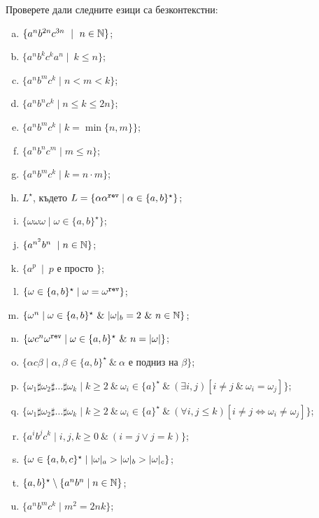 \begin{extra}
\begin{problem}
  Проверете дали следните езици са безконтекстни:
  \begin{enumerate}[a)]
  \item
    $\{a^nb^{2n}c^{3n}\ \mid\ n\in\Nat\}$;
  \item
    $\{a^nb^kc^ka^n\mid\ k \leq n\}$;
  \item
    $\{a^nb^mc^k\mid n < m < k\}$;
  \item
    $\{a^nb^nc^k\mid n \leq k \leq 2n\}$;
  \item
    $\{a^nb^mc^k\mid k = \min\{n,m\}\}$;
  \item
    $\{a^nb^nc^m\mid m \leq n\}$;
  \item
    $\{a^nb^mc^k\mid k = n\cdot m\}$;
  \item
    $L^\star$, където
    $L = \{\alpha\alpha^{\texttt{rev}} \mid \alpha \in \{a,b\}^\star\}$;
  \item
    $\{\omega\omega\omega\mid \omega\in \{a,b\}^\star\}$;
  \item
    $\{a^{n^2}b^n\ \mid n \in \mathbb{N}\}$;
  \item
    $\{a^p\ \mid\ p\mbox{ е просто }\}$;
  \item
    $\{\omega \in \{a,b\}^\star \mid \omega = \omega^{\texttt{rev}}\}$;
  \item
    $\{\omega^n \mid \omega \in \{a,b\}^\star\ \&\ \vert{\omega}\vert_{b} = 2\ \&\ n \in \mathbb{N}\}$;
  \item
    $\{\omega c^n \omega^{\texttt{rev}} \mid \omega \in \{a,b\}^\star\ \&\ n = \vert{\omega}\vert\}$;
  \item
    $\{\alpha c \beta \mid \alpha,\beta \in \{a,b\}^\star\ \&\ \alpha\mbox{ е подниз на }\beta\}$;
  \item
    $\{\omega_1 \sharp \omega_2 \sharp \dots \sharp \omega_k\mid k\geq 2\ \&\ \omega_i\in \{a\}^\star\ \&\ (\exists i,j)[i \neq j\ \&\ \omega_i = \omega_j]\}$;
  \item
    $\{\omega_1 \sharp \omega_2 \sharp \dots \sharp \omega_k\mid k\geq 2\ \&\ \omega_i\in \{a\}^\star\ \&\ (\forall i,j \leq k)[i \neq j \iff \omega_i \neq \omega_j]\}$;
  \item
    $\{a^ib^jc^k\mid i,j,k\geq 0\ \&\ (i = j \vee j = k)\}$;
  \item
    $\{\omega \in \{a,b,c\}^\star\mid \vert{\omega}\vert_{a} > \vert{\omega}\vert_{b} > \vert{\omega}\vert_{c}\}$;
  \item
    $\{a,b\}^\star \setminus \{a^nb^n\mid n\in \mathbb{N}\}$;
  \item
    $\{a^nb^mc^k \mid m^2 = 2nk\}$;


\end{enumerate}
\end{problem}
\end{extra}
